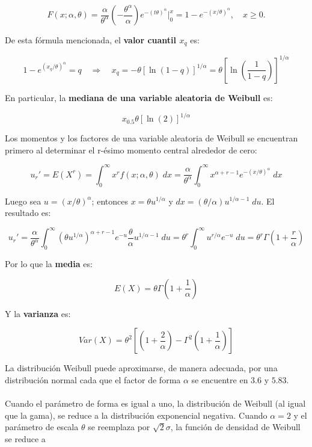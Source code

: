\begin{tcolorbox}
    $$F(x;\alpha,\theta)=\dfrac{\alpha}{\theta^\alpha}\left(-\dfrac{\theta^\alpha}{\alpha}\right)e^{-(t\theta)^\alpha}\bigg|_0^x=1-e^{-(x/\theta)^\alpha},\quad x\geq 0.$$
\end{tcolorbox}

De esta fórmula mencionada, el \textbf{\boldmath valor cuantil $x_q$} es:

\begin{tcolorbox}
    $$1-e^{(x_q/\theta)^\alpha}=q \quad \Rightarrow \quad x_q=-\theta[\ln(1-q)]^{1/\alpha}=\theta\left[\ln\left(\dfrac{1}{1-q}\right)\right]^{1/\alpha}$$
\end{tcolorbox}

En particular, la \textbf{mediana de una variable aleatoria de Weibull} es:
\begin{tcolorbox}
    $$x_{0.5}\theta[\ln(2)]^{1/\alpha}$$
\end{tcolorbox}

Los momentos y los factores de una variable aleatoria de Weibull se encuentran primero al determinar el r-ésimo momento central alrededor de cero:

$$u_r'= E(X^r)=\int_0^\infty x^r f(x;\alpha,\theta)\; dx = \dfrac{\alpha}{\theta^\alpha}\int_0^\infty x^{\alpha+r-1}e^{-(x/\theta)^\alpha}\; dx$$

Luego sea $u=(x/\theta)^\alpha$; entonces $x=\theta u^{1/\alpha}$ y $dx=(\theta/\alpha)u^{1/\alpha - 1}\; du$. El resultado es:

$$u_r' = \dfrac{\alpha}{\theta^\alpha}\int_0^\infty (\theta u^{1/\alpha})^{\alpha+r-1}e^{-u}\dfrac{\theta}{\alpha}u^{1/\alpha-1}\; du = \theta^r\int_0^\infty u^{r/\alpha}e^{-u}\; du = \theta^r \Gamma\left(1+\dfrac{r}{\alpha}\right)$$

Por lo que la \textbf{media} es:

\begin{tcolorbox}
    $$E(X)=\theta \Gamma\left(1+\dfrac{1}{\alpha}\right)$$
\end{tcolorbox}

Y la \textbf{varianza} es:

\begin{tcolorbox}
    $$Var(X)=\theta^2\left[\left(1+\dfrac{2}{\alpha}\right)-\Gamma^2\left(1+\dfrac{1}{\alpha}\right)\right]$$
\end{tcolorbox}

La distribución Weibull puede aproximarse, de manera adecuada, por una distribución normal cada que el factor de forma $\alpha$ se encuentre en $3.6$ y $5.83$.\\\\
Cuando el parámetro de forma es igual a uno, la distribución de Weibull (al igual que la gama), se reduce a la distribución exponencial negativa. Cuando $\alpha=2$ y el parámetro de escala $\theta$ se reemplaza por $\sqrt{2}\sigma$, la función de densidad de Weibull se reduce a

